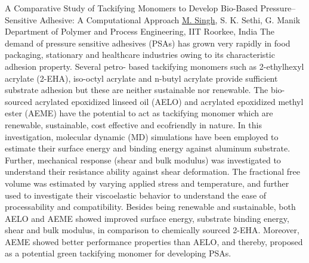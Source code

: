 
    \begin{abstract_online}{A Comparative Study of Tackifying Monomers to Develop Bio-Based Pressure–Sensitive Adhesive: A Computational Approach }{%
        \underline{M. Singh}, S. K. Sethi, G. Manik}{%
        }{%
        Department of Polymer and Process Engineering, IIT Roorkee, India }
    The demand of pressure sensitive adhesives (PSAs) has grown very rapidly in food packaging, stationary and healthcare industries owing to its characteristic adhesion property. Several petro- based tackifying monomers such as 2-ethylhexyl acrylate (2-EHA), iso-octyl acrylate and n-butyl acrylate provide sufficient substrate adhesion but these are neither sustainable nor renewable. The bio-sourced acrylated epoxidized linseed oil (AELO) and acrylated epoxidized methyl ester (AEME) have the potential to act as tackifying monomer which are renewable, sustainable, cost effective and ecofriendly in nature. In this investigation, molecular dynamic (MD) simulations have been employed to estimate their surface energy and binding energy against aluminum substrate. Further, mechanical response (shear and bulk modulus) was investigated to understand their resistance ability against shear deformation. The fractional free volume was estimated by varying applied stress and temperature, and further used to investigate their viscoelastic behavior to understand the ease of processability and compatibility. Besides being renewable and sustainable, both AELO and AEME showed improved surface energy, substrate binding energy, shear and bulk modulus, in comparison to chemically sourced 2-EHA. Moreover, AEME showed better performance properties than AELO, and thereby, proposed as a potential green tackifying monomer for developing PSAs. 
    
    \end{abstract_online}
    